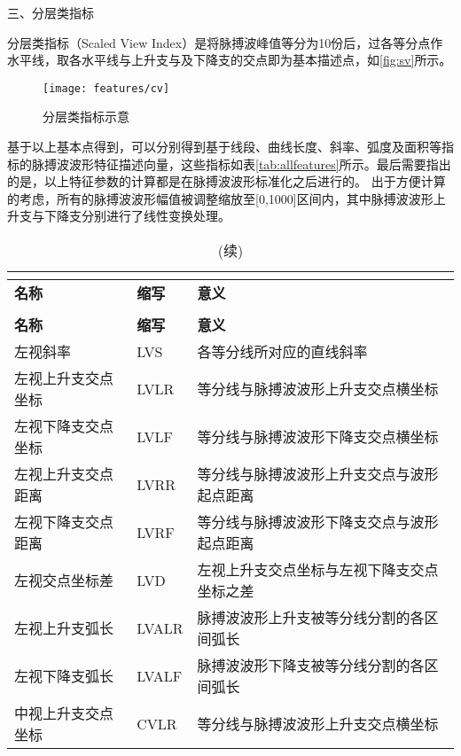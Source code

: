 三、分层类指标

分层类指标（Scaled View Index）是将脉搏波峰值等分为10份后，过各等分点作水平线，取各水平线与上升支与及下降支的交点即为基本描述点，如\autoref{fig:sv}所示。
\begin{figure}[htbp]
  \centering
  \texttt{[image: features/cv]}
  \caption{\label{fig:sv}分层类指标示意}
\end{figure}

基于以上基本点得到，可以分别得到基于线段、曲线长度、斜率、弧度及面积等指标的脉搏波波形特征描述向量，这些指标如表\autoref{tab:allfeatures}所示。最后需要指出的是，以上特征参数的计算都是在脉搏波波形标准化之后进行的。
出于方便计算的考虑，所有的脉搏波波形幅值被调整缩放至[0,1000]区间内，其中脉搏波波形上升支与下降支分别进行了线性变换处理。
\begin{center}
  \begin{longtable}{m{4cm}<{\centering}m{2cm}<{\centering}m{8.5cm}<{\centering}}
    \caption{本研究使用的所有PPG时域指标一览}\\
    \label{tab:allfeatures}\\
        \toprule
        \textbf{名称}&\textbf{缩写}&\textbf{意义}\\
        \midrule
        \endfirsthead
        \caption[]{(续)}\\
        \midrule
        \textbf{名称}&\textbf{缩写}&\textbf{意义}\\
        \midrule
        \endhead 
        \midrule
        \endfoot
        \bottomrule
        \endlastfoot
        左视斜率    &   LVS    &   各等分线所对应的直线斜率   \\
        左视上升支交点坐标 & LVLR & 等分线与脉搏波波形上升支交点横坐标 \\
        左视下降支交点坐标 & LVLF & 等分线与脉搏波波形下降支交点横坐标 \\
        左视上升支交点距离 & LVRR & 等分线与脉搏波波形上升支交点与波形起点距离 \\
        左视下降支交点距离 & LVRF & 等分线与脉搏波波形下降支交点与波形起点距离 \\
        左视交点坐标差 & LVD & 左视上升支交点坐标与左视下降支交点坐标之差 \\
        左视上升支弧长 & LVALR & 脉搏波波形上升支被等分线分割的各区间弧长 \\
        左视下降支弧长 & LVALF & 脉搏波波形下降支被等分线分割的各区间弧长 \\
        中视上升支交点坐标 & CVLR & 等分线与脉搏波波形上升支交点横坐标 \\

\end{longtable}
\end{center}
